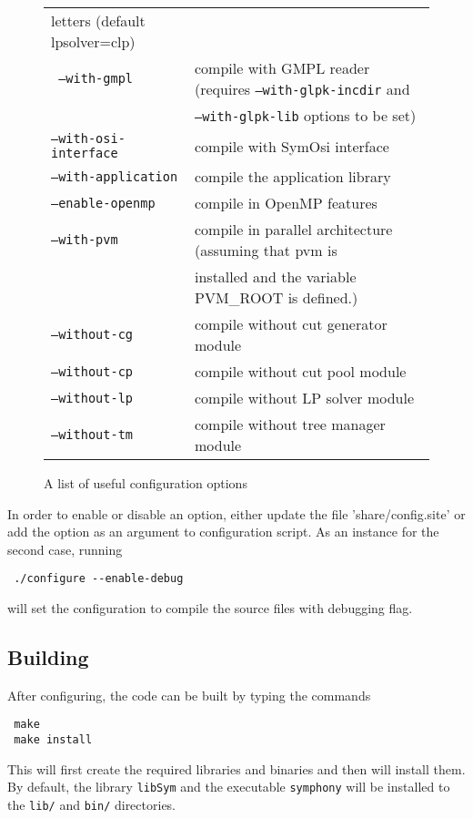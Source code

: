 \begin{figure}[htb]
\begin{tabular}{ll}
letters (default lpsolver=clp) \\
\texttt{ --with-gmpl} &  compile with GMPL reader (requires 
\texttt{--with-glpk-incdir} and \\ &
\texttt{--with-glpk-lib} options to be set) \\
\texttt{--with-osi-interface} &  compile with SymOsi interface \\
\texttt{--with-application} &  compile the application library \\
\hline
\texttt{--enable-openmp} &   compile in OpenMP features \\
\texttt{--with-pvm } &  compile in parallel architecture (assuming that pvm is \\ 
&installed and the variable PVM\_ROOT is defined.) \\
\texttt{--without-cg} &  compile without cut generator module \\
\texttt{--without-cp} &  compile without cut pool module \\
\texttt{--without-lp} &  compile without LP solver module \\
\texttt{--without-tm} &  compile without tree manager module
\end{tabular}
\caption{A list of useful configuration options \label{conf_opts}}
\end{figure}

In order to enable or disable an option, either update the file 
'share/config.site' or add the option as an argument to configuration script. 
As an instance for the second case, running 
{\color{Brown}
\begin{verbatim}
 ./configure --enable-debug
\end{verbatim}
}
will set the configuration to compile the source files with debugging
flag. 

\subsection{Building}\label{building}

After configuring, the code can be built by typing the commands
{\color{Brown}
\begin{verbatim}
 make
 make install
\end{verbatim}
}
This will first create the required libraries and binaries and then will
install them. By default, the library \texttt{libSym} and the executable
\texttt{symphony} will be installed to the \texttt{lib/} and \texttt{bin/}
directories.

